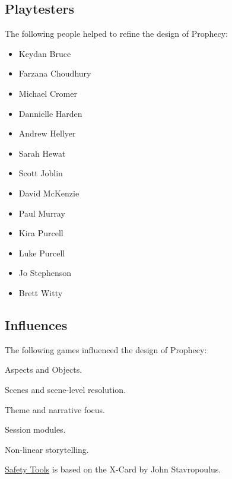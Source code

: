 \documentclass[12pt, a5paper, parskip=half-]{scrartcl}
\begin{document}
\subsection*{Playtesters} \label{subsection:playtesters}
The following people helped to refine the design of Prophecy:\vspace{-1.75ex}
\begin{multicols}{2}
\begin{itemize}[noitemsep,nolistsep,  leftmargin=0.68cm,topsep=-1ex]%
  \item Keydan Bruce
  \item Farzana Choudhury
  \item Michael Cromer
  \item Dannielle Harden
  \item Andrew Hellyer
  \item Sarah Hewat
  \item Scott Joblin
  \item David McKenzie
  \item Paul Murray
  \item Kira Purcell
  \item Luke Purcell
  \item Jo Stephenson
  \item Brett Witty
\end{itemize}
\end{multicols}

\subsection*{Influences} \label{subsection:influences}
The following games influenced the design of Prophecy:
\begin{description}[labelindent=0.25cm, leftmargin=\widthof{\hspace{0.25cm}\textbullet\space}, font=\normalfont\textbullet\space, noitemsep, topsep=-1ex]
	\item[Fate:] Aspects and Objects.
	\item[Fiasco:] Scenes and scene-level resolution.
	\item[Our Last Best Hope:] Theme and narrative focus.
	\item[10 Candles:] Session modules.
	\item[Microscope:] Non-linear storytelling.
\end{description}
\vspace{1ex}
\hyperref[subsection:safety-tools]{\cinzel \small Safety Tools} is based on the X-Card by John Stavropoulus.
\end{document}
